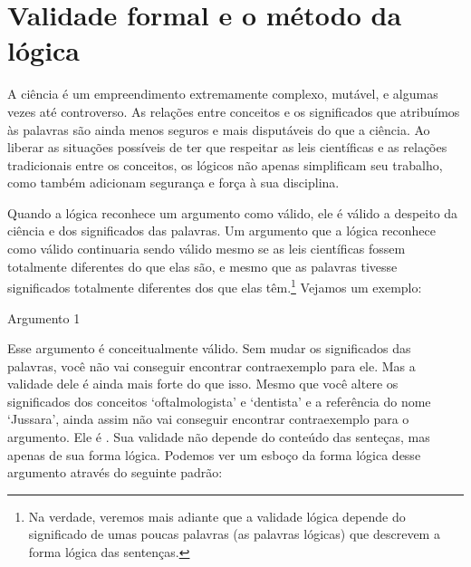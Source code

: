 \section{Validade formal e o método da lógica}
A ciência é um empreendimento extremamente complexo, mutável, e algumas vezes até controverso. As relações entre conceitos e os significados que atribuímos às palavras são ainda menos seguros e mais disputáveis do que a ciência.
Ao liberar as situações possíveis de ter que respeitar as leis científicas e as relações tradicionais entre os conceitos, os lógicos não apenas simplificam seu trabalho, como também adicionam segurança e força à sua disciplina.

Quando a lógica reconhece um argumento como válido, ele é válido a despeito da ciência e dos significados das palavras.
Um argumento que a lógica reconhece como válido continuaria sendo válido mesmo se as leis científicas fossem totalmente diferentes do que elas são, e mesmo que as palavras tivesse significados totalmente diferentes dos que elas têm.\footnote{
	Na verdade, veremos mais adiante que a validade lógica depende do significado de umas poucas palavras (as palavras lógicas) que descrevem a forma lógica das sentenças.}
Vejamos um exemplo:
\begin{description}
\item[Argumento 1]
\end{description}
Esse argumento é conceitualmente válido.
Sem mudar os significados das palavras, você não vai conseguir encontrar contraexemplo para ele.
Mas a validade dele é ainda mais forte do que isso.
Mesmo que você altere os significados dos conceitos `oftalmologista' e `dentista' e a referência do nome `Jussara', ainda assim não vai conseguir encontrar contraexemplo para o argumento.
Ele é .
Sua validade não depende do conteúdo das senteças, mas apenas de sua forma lógica.
Podemos ver um esboço da forma lógica desse argumento através do seguinte padrão:


